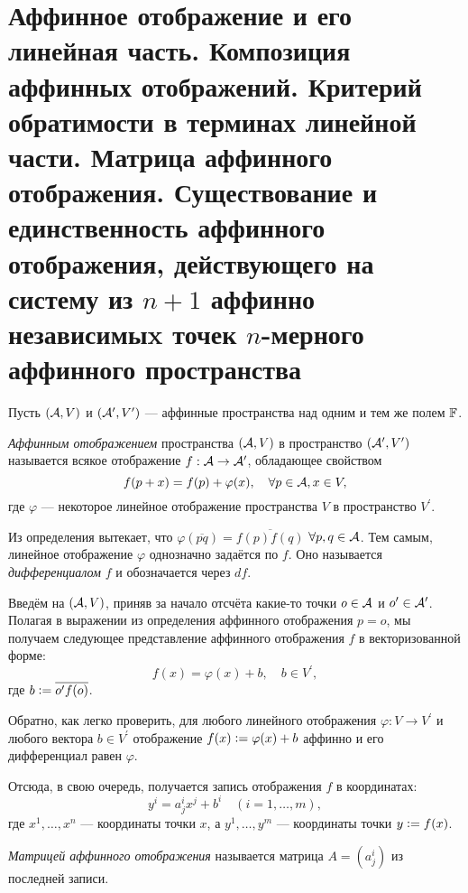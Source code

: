 \section{Аффинное отображение и его линейная часть. Композиция аффинных отображений. Критерий обратимости в терминах линейной части. Матрица аффинного отображения. Существование и единственность аффинного отображения, действующего на систему из $n + 1$ аффинно независимыx точек $n$-мерного аффинного пространства}

Пусть $(\mathcal{A}, V)$ и $(\mathcal{A}^\prime, V^\prime)$ --- аффинные пространства над одним и тем же полем $\mathbb{F}$.

\begin{definition}
    \textit{Аффинным отображением} пространства $(\mathcal{A}, V)$ в пространство $(\mathcal{A}^\prime, V^\prime)$ называется всякое отображение $f: \mathcal{A} \to \mathcal{A}^\prime$, обладающее свойством
    \[
        f(p + x) = f(p) + \varphi(x),\quad\forall p \in \mathcal{A}, x \in V,
    \]
    где $\varphi$ --- некоторое линейное отображение пространства $V$ в пространство $V^\prime$.
\end{definition}

Из определения вытекает, что $\varphi(\overline{pq}) = \overline{f(p)f(q)}$ $\forall p, q \in \mathcal{A}$. Тем самым, линейное отображение $\varphi$ однозначно задаётся по $f$. Оно называется \textit{дифференциалом} $f$ и обозначается через $df$.

Введём на $(\mathcal{A}, V)$, приняв за начало отсчёта какие-то точки $o \in \mathcal{A}$ и $o^\prime \in \mathcal{A}^\prime$. Полагая в выражении из определения аффинного отображения $p = o$, мы получаем следующее представление аффинного отображения $f$ в векторизованной форме:
\[
    f(x) = \varphi(x) + b,\quad b \in V^\prime,
\]
где $b \vcentcolon = \overline{o^\prime f(o)}$.

Обратно, как легко проверить, для любого линейного отображения $\varphi: V \to V^\prime$ и любого вектора $b \in V^\prime$ отображение $f(x) \vcentcolon = \varphi(x) + b$ аффинно и его дифференциал равен $\varphi$.

Отсюда, в свою очередь, получается запись отображения $f$ в координатах:
\[
    y^i = a^i_jx^j + b^i\quad(i = 1, \ldots, m),
\]
где $x^1, \ldots, x^n$ --- координаты точки $x$, а $y^1, \ldots, y^m$ --- координаты точки $y \vcentcolon = f(x)$.

\begin{definition}
    \textit{Матрицей аффинного отображения} называется матрица $A = (a^i_j)$ из последней записи.
\end{definition}

